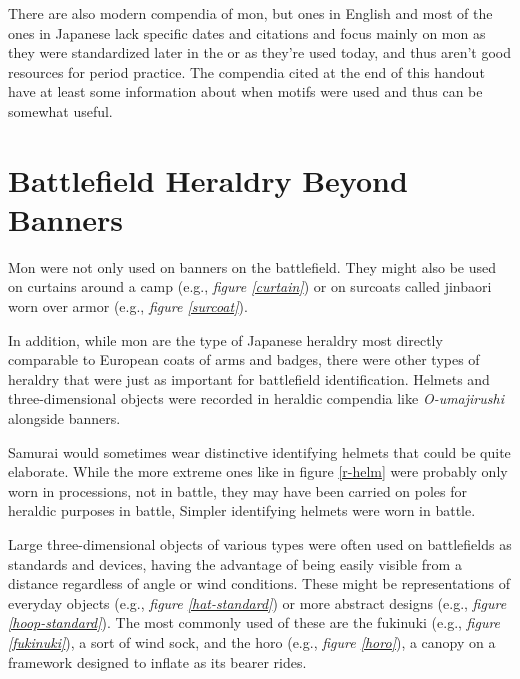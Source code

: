 \documentclass{article}
\begin{document}
  There are also modern compendia of mon, but ones in English and most
  of the ones in Japanese lack specific dates and citations and focus
  mainly on mon as they were standardized later in the \EdoPeriod{} or
  as they're used today, and thus aren't good resources for period
  practice.  The compendia cited at the end of this handout have at least
  some information about when motifs were used and thus can be somewhat
  useful.

\section{Battlefield Heraldry Beyond Banners}

Mon were not only used on banners on the battlefield. They might also
be used on curtains around a camp (e.g., \emph{figure \ref{curtain}})
or on surcoats called jinbaori worn over armor (e.g., \emph{figure
  \ref{surcoat}}).

In addition, while mon are the type of Japanese heraldry most directly
comparable to European coats of arms and badges, there were other
types of heraldry that were just as important for battlefield
identification. Helmets and three-dimensional objects were recorded in
heraldic compendia like \emph{O-umajirushi} alongside banners.

Samurai would sometimes wear distinctive identifying helmets that could
be quite elaborate. While the more extreme ones like in figure
\ref{r-helm} were probably only worn in processions, not in battle, they
may have been carried on poles for heraldic purposes in battle, Simpler
identifying helmets were worn in battle.

Large three-dimensional objects of various types were often used on
battlefields as standards and devices, having the advantage of being
easily visible from a distance regardless of angle or wind
conditions. These might be representations of everyday objects (e.g.,
\emph{figure \ref{hat-standard}}) or more abstract designs (e.g.,
\emph{figure \ref{hoop-standard}}). The most commonly used of these
are the fukinuki (e.g., \emph{figure \ref{fukinuki}}), a sort of wind
sock, and the horo (e.g., \emph{figure \ref{horo}}), a canopy on a
framework designed to inflate as its bearer rides.

\begin{figure}[b!]
\begin{subfigs}
\end{subfigs}
\begin{subfigs}
\end{subfigs}
\end{figure}
\end{document}
